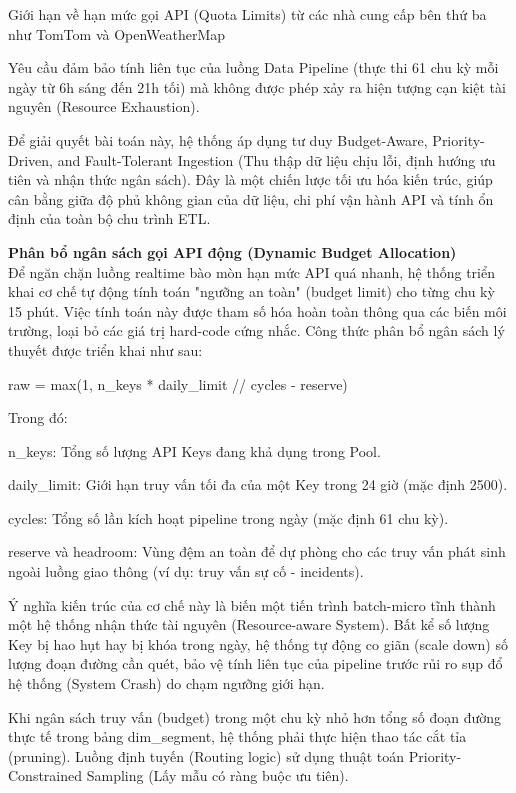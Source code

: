 Giới hạn về hạn mức gọi API (Quota Limits) từ các nhà cung cấp bên thứ ba như TomTom và OpenWeatherMap


Yêu cầu đảm bảo tính liên tục của luồng Data Pipeline (thực thi 61 chu kỳ mỗi ngày từ 6h sáng đến 21h tối) mà không được phép xảy ra hiện tượng cạn kiệt tài nguyên (Resource Exhaustion).


Để giải quyết bài toán này, hệ thống áp dụng tư duy Budget-Aware, Priority-Driven, and Fault-Tolerant Ingestion (Thu thập dữ liệu chịu lỗi, định hướng ưu tiên và nhận thức ngân sách). Đây là một chiến lược tối ưu hóa kiến trúc, giúp cân bằng giữa độ phủ không gian của dữ liệu, chi phí vận hành API và tính ổn định của toàn bộ chu trình ETL.


\textbf{Phân bổ ngân sách gọi API động (Dynamic Budget Allocation)}\\
Để ngăn chặn luồng realtime bào mòn hạn mức API quá nhanh, hệ thống triển khai cơ chế tự động tính toán "ngưỡng an toàn" (budget limit) cho từng chu kỳ 15 phút. Việc tính toán này được tham số hóa hoàn toàn thông qua các biến môi trường, loại bỏ các giá trị hard-code cứng nhắc. Công thức phân bổ ngân sách lý thuyết được triển khai như sau:


raw = max(1, n\_keys * daily\_limit // cycles - reserve)


Trong đó:


n\_keys: Tổng số lượng API Keys đang khả dụng trong Pool.


daily\_limit: Giới hạn truy vấn tối đa của một Key trong 24 giờ (mặc định 2500).


cycles: Tổng số lần kích hoạt pipeline trong ngày (mặc định 61 chu kỳ).


reserve và headroom: Vùng đệm an toàn để dự phòng cho các truy vấn phát sinh ngoài luồng giao thông (ví dụ: truy vấn sự cố - incidents).


Ý nghĩa kiến trúc của cơ chế này là biến một tiến trình batch-micro tĩnh thành một hệ thống nhận thức tài nguyên (Resource-aware System). Bất kể số lượng Key bị hao hụt hay bị khóa trong ngày, hệ thống tự động co giãn (scale down) số lượng đoạn đường cần quét, bảo vệ tính liên tục của pipeline trước rủi ro sụp đổ hệ thống (System Crash) do chạm ngưỡng giới hạn.


Khi ngân sách truy vấn (budget) trong một chu kỳ nhỏ hơn tổng số đoạn đường thực tế trong bảng dim\_segment, hệ thống phải thực hiện thao tác cắt tỉa (pruning). Luồng định tuyến (Routing logic) sử dụng thuật toán Priority-Constrained Sampling (Lấy mẫu có ràng buộc ưu tiên).


